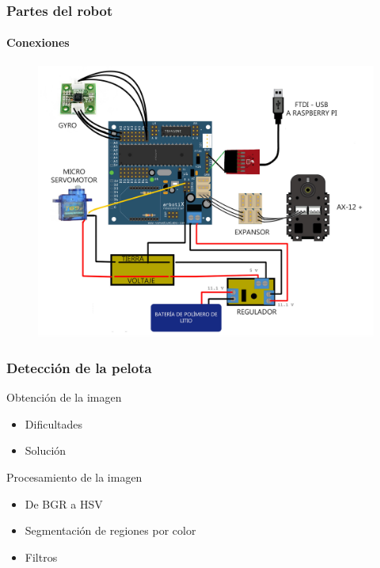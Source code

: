 \documentclass{beamer}
\begin{document}
\begin{frame}
\frametitle{Partes del robot}
\framesubtitle{Conexiones}


\begin{figure}[hbtp]
\centering
\includegraphics[scale=0.1]{arbotix_servo.jpg} 
\end{figure}

\end{frame}

\begin{frame}
\frametitle{Detecci\'on de la pelota}

\begin{block}{Obtenci\'on de la imagen}
	\begin{itemize}
		\item Dificultades
		\item Soluci\'on	
	\end{itemize}
\end{block}

\begin{block}{Procesamiento de la imagen}
	\begin{itemize}
	\item De BGR a HSV
	\item Segmentaci\'on de regiones por color
	\item Filtros 
    \end{itemize}		
\end{block}

\end{frame}
\end{document}
